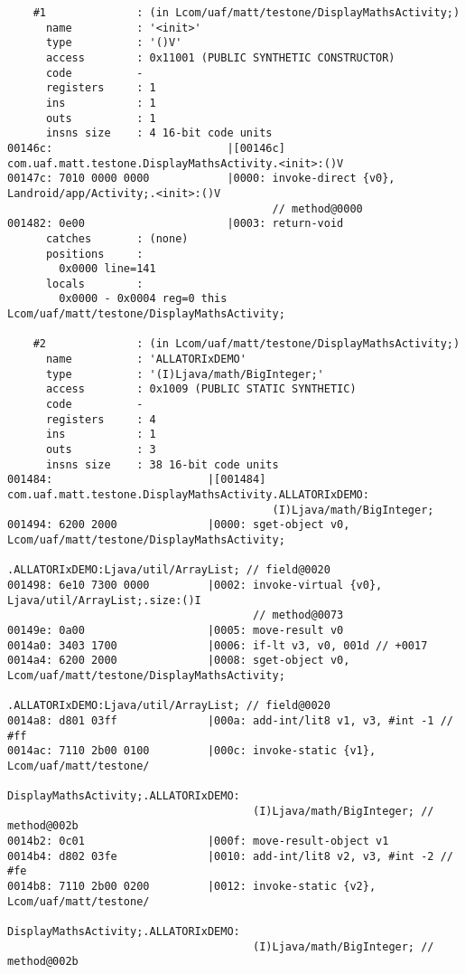 \begin{lstlisting}
    #1              : (in Lcom/uaf/matt/testone/DisplayMathsActivity;)
      name          : '<init>'
      type          : '()V'
      access        : 0x11001 (PUBLIC SYNTHETIC CONSTRUCTOR)
      code          -
      registers     : 1
      ins           : 1
      outs          : 1
      insns size    : 4 16-bit code units
00146c:                           |[00146c] com.uaf.matt.testone.DisplayMathsActivity.<init>:()V
00147c: 7010 0000 0000            |0000: invoke-direct {v0}, Landroid/app/Activity;.<init>:()V
                                         // method@0000
001482: 0e00                      |0003: return-void
      catches       : (none)
      positions     :
        0x0000 line=141
      locals        :
        0x0000 - 0x0004 reg=0 this Lcom/uaf/matt/testone/DisplayMathsActivity;

    #2              : (in Lcom/uaf/matt/testone/DisplayMathsActivity;)
      name          : 'ALLATORIxDEMO'
      type          : '(I)Ljava/math/BigInteger;'
      access        : 0x1009 (PUBLIC STATIC SYNTHETIC)
      code          -
      registers     : 4
      ins           : 1
      outs          : 3
      insns size    : 38 16-bit code units
001484:                        |[001484] com.uaf.matt.testone.DisplayMathsActivity.ALLATORIxDEMO:
                                         (I)Ljava/math/BigInteger;
001494: 6200 2000              |0000: sget-object v0, Lcom/uaf/matt/testone/DisplayMathsActivity;
                                      .ALLATORIxDEMO:Ljava/util/ArrayList; // field@0020
001498: 6e10 7300 0000         |0002: invoke-virtual {v0}, Ljava/util/ArrayList;.size:()I
                                      // method@0073
00149e: 0a00                   |0005: move-result v0
0014a0: 3403 1700              |0006: if-lt v3, v0, 001d // +0017
0014a4: 6200 2000              |0008: sget-object v0, Lcom/uaf/matt/testone/DisplayMathsActivity;
                                      .ALLATORIxDEMO:Ljava/util/ArrayList; // field@0020
0014a8: d801 03ff              |000a: add-int/lit8 v1, v3, #int -1 // #ff
0014ac: 7110 2b00 0100         |000c: invoke-static {v1}, Lcom/uaf/matt/testone/
                                      DisplayMathsActivity;.ALLATORIxDEMO:
                                      (I)Ljava/math/BigInteger; // method@002b
0014b2: 0c01                   |000f: move-result-object v1
0014b4: d802 03fe              |0010: add-int/lit8 v2, v3, #int -2 // #fe
0014b8: 7110 2b00 0200         |0012: invoke-static {v2}, Lcom/uaf/matt/testone/
                                      DisplayMathsActivity;.ALLATORIxDEMO:
                                      (I)Ljava/math/BigInteger; // method@002b

\end{lstlisting}
